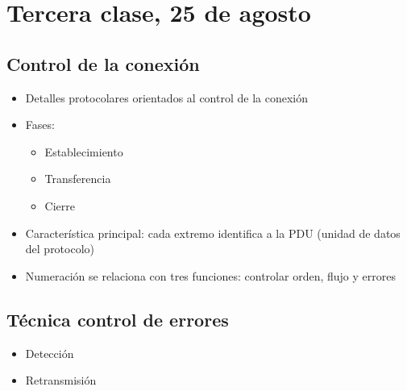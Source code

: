 \section{Tercera clase, 25 de agosto}

\subsection{Control de la conexión}
\begin{itemize}
    \item Detalles protocolares orientados al control de la conexión 
    \item Fases:
    \begin{itemize}
        \item Establecimiento
        \item Transferencia
        \item Cierre
    \end{itemize}
    \item Característica principal: cada extremo identifica a la PDU 
    (unidad de datos del protocolo)
    \item Numeración se relaciona con tres funciones: 
    controlar orden, flujo y errores
\end{itemize}

\subsection{Técnica control de errores}
\begin{itemize}
    \item Detección 
    \item Retransmisión
\end{itemize}